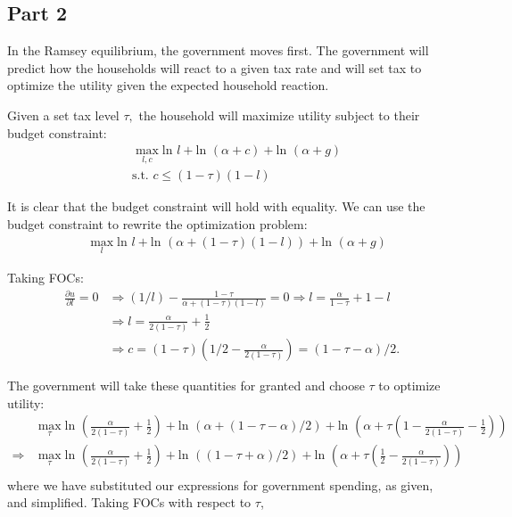 \documentclass[11pt]{article} %
\begin{document}
\subsection{Part 2}
In the Ramsey equilibrium, the government moves first. The government will predict how the households will react to a given tax rate and will set tax to optimize the utility given the expected household reaction. 

Given a set tax level $\tau,$ the household will maximize utility subject to their budget constraint:
\begin{align*}
&\max_{l,c} \text{ln }l +\text{ln }(\alpha + c) +\text{ln }(\alpha + g)\\
&\text{s.t. } c \leq (1-\tau)(1-l)
\end{align*}

It is clear that the budget constraint will hold with equality. We can use the budget constraint to rewrite the optimization problem:
\begin{align*}
&\max_{l} \text{ln }l +\text{ln }(\alpha + (1-\tau)(1-l)) +\text{ln }(\alpha + g)
\end{align*}

Taking FOCs:
\begin{align*}
\frac{\partial u}{\partial l} = 0 &\Rightarrow (1/l) - \frac{1-\tau}{\alpha + (1-\tau)(1-l)} = 0 \Rightarrow l = \frac{\alpha}{1-\tau} +1 - l \\
&\Rightarrow l = \frac{\alpha}{2(1-\tau)} + \frac{1}{2}\\
&\Rightarrow c = (1-\tau)\left(1/2 -\frac{\alpha}{2(1-\tau)}  \right) = (1-\tau - \alpha)/2.
\end{align*}

The government will take these quantities for granted and choose $\tau$ to optimize utility:
\begin{align*}
&\max_{\tau} \text{ln }\left(\frac{\alpha}{2(1-\tau)} + \frac{1}{2}\right) +\text{ln }\left(\alpha + (1-\tau - \alpha)/2\right) +\text{ln }\left(\alpha + \tau\left(1- \frac{\alpha}{2(1-\tau)} - \frac{1}{2} \right)\right)\\
\Rightarrow &\max_{\tau}  \text{ln }\left(\frac{\alpha}{2(1-\tau)} + \frac{1}{2}\right) +\text{ln }\left( (1-\tau + \alpha)/2\right) +\text{ln }\left(\alpha + \tau\left(\frac{1}{2}- \frac{\alpha}{2(1-\tau)} \right)\right)\\
\end{align*}
where we have substituted our expressions for government spending, as given, and simplified. Taking FOCs with respect to $\tau$,
\end{document}
